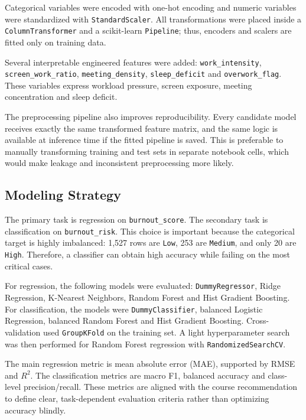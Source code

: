 \documentclass[conference]{IEEEtran}
\begin{document}
Categorical variables were encoded with one-hot encoding and numeric variables
were standardized with \texttt{StandardScaler}. All transformations were placed
inside a \texttt{ColumnTransformer} and a scikit-learn \texttt{Pipeline}; thus,
encoders and scalers are fitted only on training data.

Several interpretable engineered features were added:
\texttt{work\_intensity}, \texttt{screen\_work\_ratio},
\texttt{meeting\_density}, \texttt{sleep\_deficit} and
\texttt{overwork\_flag}. These variables express workload pressure, screen
exposure, meeting concentration and sleep deficit.

The preprocessing pipeline also improves reproducibility. Every candidate model
receives exactly the same transformed feature matrix, and the same logic is
available at inference time if the fitted pipeline is saved. This is preferable
to manually transforming training and test sets in separate notebook cells,
which would make leakage and inconsistent preprocessing more likely.

\subsection{Modeling Strategy}

The primary task is regression on \texttt{burnout\_score}. The secondary task is
classification on \texttt{burnout\_risk}. This choice is important because the
categorical target is highly imbalanced: 1,527 rows are \texttt{Low}, 253 are
\texttt{Medium}, and only 20 are \texttt{High}. Therefore, a classifier can
obtain high accuracy while failing on the most critical cases.

For regression, the following models were evaluated: \texttt{DummyRegressor},
Ridge Regression, K-Nearest Neighbors, Random Forest and Hist Gradient Boosting.
For classification, the models were \texttt{DummyClassifier}, balanced Logistic
Regression, balanced Random Forest and Hist Gradient Boosting. Cross-validation
used \texttt{GroupKFold} on the training set. A light hyperparameter search was
then performed for Random Forest regression with \texttt{RandomizedSearchCV}.

The main regression metric is mean absolute error (MAE), supported by RMSE and
$R^2$. The classification metrics are macro F1, balanced accuracy and
class-level precision/recall. These metrics are aligned with the course
recommendation to define clear, task-dependent evaluation criteria rather than
optimizing accuracy blindly.
\end{document}
